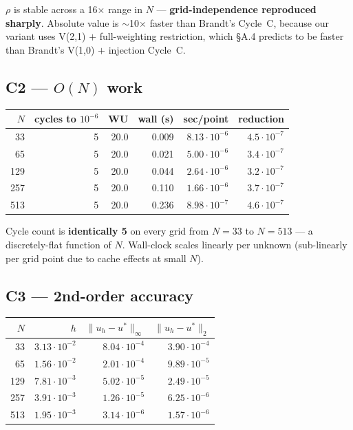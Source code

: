 \documentclass[11pt]{article}
\begin{document}
$\rho$ is stable across a 16$\times$ range in $N$ --- \textbf{grid-independence reproduced sharply}. Absolute value is $\sim$10$\times$ faster than Brandt's Cycle~C, because our variant uses V(2,1) $+$ full-weighting restriction, which \S A.4 predicts to be faster than Brandt's V(1,0) $+$ injection Cycle~C.

\subsection{C2 --- $O(N)$ work}

\begin{center}
\begin{tabular}{rrrrrr}
\toprule
$N$ & cycles to $10^{-6}$ & WU & wall (s) & sec/point & reduction \\
\midrule
33  & 5 & 20.0 & 0.009 & $8.13 \cdot 10^{-6}$ & $4.5 \cdot 10^{-7}$ \\
65  & 5 & 20.0 & 0.021 & $5.00 \cdot 10^{-6}$ & $3.4 \cdot 10^{-7}$ \\
129 & 5 & 20.0 & 0.044 & $2.64 \cdot 10^{-6}$ & $3.2 \cdot 10^{-7}$ \\
257 & 5 & 20.0 & 0.110 & $1.66 \cdot 10^{-6}$ & $3.7 \cdot 10^{-7}$ \\
513 & 5 & 20.0 & 0.236 & $8.98 \cdot 10^{-7}$ & $4.6 \cdot 10^{-7}$ \\
\bottomrule
\end{tabular}
\end{center}

Cycle count is \textbf{identically 5} on every grid from $N=33$ to $N=513$ --- a discretely-flat function of $N$. Wall-clock scales linearly per unknown (sub-linearly per grid point due to cache effects at small $N$).

\subsection{C3 --- 2nd-order accuracy}

\begin{center}
\begin{tabular}{rrrr}
\toprule
$N$ & $h$ & $\|u_h - u^*\|_\infty$ & $\|u_h - u^*\|_2$ \\
\midrule
33  & $3.13 \cdot 10^{-2}$ & $8.04 \cdot 10^{-4}$ & $3.90 \cdot 10^{-4}$ \\
65  & $1.56 \cdot 10^{-2}$ & $2.01 \cdot 10^{-4}$ & $9.89 \cdot 10^{-5}$ \\
129 & $7.81 \cdot 10^{-3}$ & $5.02 \cdot 10^{-5}$ & $2.49 \cdot 10^{-5}$ \\
257 & $3.91 \cdot 10^{-3}$ & $1.26 \cdot 10^{-5}$ & $6.25 \cdot 10^{-6}$ \\
513 & $1.95 \cdot 10^{-3}$ & $3.14 \cdot 10^{-6}$ & $1.57 \cdot 10^{-6}$ \\
\bottomrule
\end{tabular}
\end{center}
\end{document}
